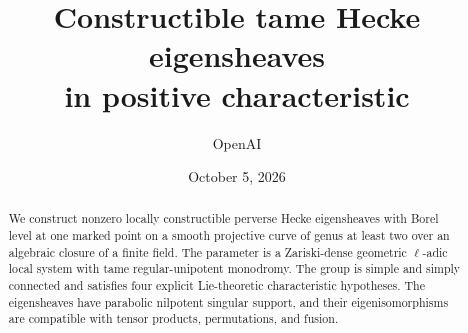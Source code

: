 \documentclass[11pt]{amsart}
\title[Constructible tame Hecke eigensheaves]{Constructible tame Hecke eigensheaves\protect\\ in positive characteristic}
\author{OpenAI}
\date{October 5, 2026}
\begin{document}
\begin{abstract}
We construct nonzero locally constructible perverse Hecke eigensheaves with Borel
level at one marked point on a smooth projective curve of genus at least two
over an algebraic closure of a finite field. The parameter is a Zariski-dense
geometric $\ell$-adic local system with tame regular-unipotent monodromy. The
group is simple and simply connected and satisfies four explicit
Lie-theoretic characteristic hypotheses. The eigensheaves have parabolic
nilpotent singular support, and their eigenisomorphisms are compatible with
tensor products, permutations, and fusion.
\end{abstract}
\maketitle
\tableofcontents










\end{document}
